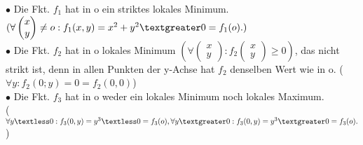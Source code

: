 \documentclass[]{scrartcl}
\begin{document}
$\bullet$ Die Fkt. $f_1$ hat in o ein striktes lokales Minimum. $(\forall 
\begin{pmatrix}
	x\\y
\end{pmatrix}\neq o:f_1(x,y)=x^2+y^2\textgreater0=f_1(o).)$\\
$\bullet$ Die Fkt. $f_2$ hat in o lokales Minimum $(\forall \begin{pmatrix}
	x\\y
\end{pmatrix}:f_2\begin{pmatrix}
x\\y
\end{pmatrix}\geq0)$, das nicht strikt ist, denn in allen Punkten der y-Achse 
hat $f_2$ denselben Wert wie in o. ($\forall y: f_2(0;y)=0=f_2(0,0)$)\\
	$\bullet$ Die Fkt. $f_3$ hat in o weder ein lokales Minimum noch lokales 
	Maximum.\\
	($\forall y \textless 0: f_3(0,y)=y^3\textless0=f_3(o), \forall y 
	\textgreater0: f_3(0,y)=y^3\textgreater0=f_3(o).$)
	
	
	
	
	
	
	
	
	
	
	
	
	
	
	
	
	
	
	
	
	
	
	
	
	
	
	
	
	
	
	
	
	
	
	
	
	
	
	
	
	
	
	
	
	
\end{document}
